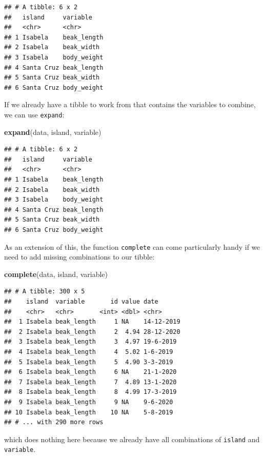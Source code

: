 \documentclass[]{book}
\newenvironment{Shaded}{}{}
\newcommand{\KeywordTok}[1]{\textcolor[rgb]{0.00,0.44,0.13}{\textbf{#1}}}
\newcommand{\NormalTok}[1]{#1}
\begin{document}
\begin{verbatim}
## # A tibble: 6 x 2
##   island     variable   
##   <chr>      <chr>      
## 1 Isabela    beak_length
## 2 Isabela    beak_width 
## 3 Isabela    body_weight
## 4 Santa Cruz beak_length
## 5 Santa Cruz beak_width 
## 6 Santa Cruz body_weight
\end{verbatim}

If we already have a tibble to work from that contains the variables to combine, we can use \texttt{expand}:

\begin{Shaded}
\begin{Highlighting}[]
\KeywordTok{expand}\NormalTok{(data, island, variable)}
\end{Highlighting}
\end{Shaded}

\begin{verbatim}
## # A tibble: 6 x 2
##   island     variable   
##   <chr>      <chr>      
## 1 Isabela    beak_length
## 2 Isabela    beak_width 
## 3 Isabela    body_weight
## 4 Santa Cruz beak_length
## 5 Santa Cruz beak_width 
## 6 Santa Cruz body_weight
\end{verbatim}

As an extension of this, the function \texttt{complete} can come particularly handy if we need to add missing combinations to our tibble:

\begin{Shaded}
\begin{Highlighting}[]
\KeywordTok{complete}\NormalTok{(data, island, variable)}
\end{Highlighting}
\end{Shaded}

\begin{verbatim}
## # A tibble: 300 x 5
##    island  variable       id value date      
##    <chr>   <chr>       <int> <dbl> <chr>     
##  1 Isabela beak_length     1 NA    14-12-2019
##  2 Isabela beak_length     2  4.94 28-12-2020
##  3 Isabela beak_length     3  4.97 19-6-2019 
##  4 Isabela beak_length     4  5.02 1-6-2019  
##  5 Isabela beak_length     5  4.90 3-3-2019  
##  6 Isabela beak_length     6 NA    21-1-2020 
##  7 Isabela beak_length     7  4.89 13-1-2020 
##  8 Isabela beak_length     8  4.99 17-3-2019 
##  9 Isabela beak_length     9 NA    9-6-2020  
## 10 Isabela beak_length    10 NA    5-8-2019  
## # ... with 290 more rows
\end{verbatim}

which does nothing here because we already have all combinations of \texttt{island} and \texttt{variable}.
\end{document}
